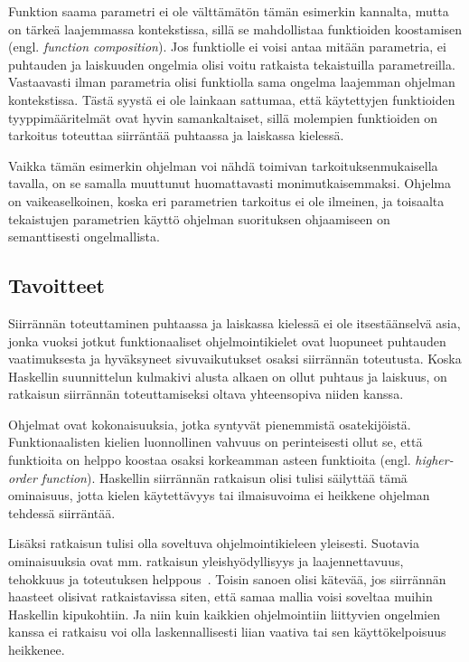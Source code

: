 \documentclass[finnish]{tktltiki2}
\begin{document}
Funktion  saama parametri  ei ole välttämätön tämän esimerkin kannalta,
mutta on tärkeä laajemmassa kontekstissa, sillä se mahdollistaa funktioiden koostamisen (engl.
\emph{function composition}). Jos funktiolle  ei voisi antaa mitään parametria, ei
puhtauden ja laiskuuden ongelmia olisi voitu ratkaista tekaistuilla parametreilla. Vastaavasti ilman
parametria  olisi funktiolla  sama ongelma laajemman ohjelman
kontekstissa. Tästä syystä ei ole lainkaan sattumaa, että käytettyjen funktioiden tyyppimääritelmät
ovat hyvin samankaltaiset, sillä molempien funktioiden on tarkoitus toteuttaa siirräntää puhtaassa
ja laiskassa kielessä.

Vaikka tämän esimerkin ohjelman voi nähdä toimivan tarkoituksenmukaisella tavalla, on se samalla
muuttunut huomattavasti monimutkaisemmaksi. Ohjelma on vaikeaselkoinen, koska eri parametrien
tarkoitus ei ole ilmeinen, ja toisaalta tekaistujen parametrien käyttö ohjelman suorituksen
ohjaamiseen on semanttisesti ongelmallista.

\subsection{Tavoitteet}

Siirrännän toteuttaminen puhtaassa ja laiskassa kielessä ei ole itsestäänselvä asia, jonka vuoksi
jotkut funktionaaliset ohjelmointikielet ovat luopuneet puhtauden vaatimuksesta ja hyväksyneet
sivuvaikutukset osaksi siirrännän toteutusta. Koska Haskellin suunnittelun kulmakivi alusta alkaen
on ollut puhtaus ja laiskuus, on ratkaisun siirrännän toteuttamiseksi oltava yhteensopiva niiden
kanssa.

Ohjelmat ovat kokonaisuuksia, jotka syntyvät pienemmistä osatekijöistä. Funktionaalisten kielien
luonnollinen vahvuus on perinteisesti ollut se, että funktioita on helppo koostaa osaksi korkeamman
asteen funktioita (engl. \emph{higher-order function}). Haskellin siirrännän ratkaisun olisi tulisi
säilyttää tämä ominaisuus, jotta kielen käytettävyys tai ilmaisuvoima ei heikkene ohjelman tehdessä
siirräntää.

Lisäksi ratkaisun tulisi olla soveltuva ohjelmointikieleen yleisesti. Suotavia ominaisuuksia ovat
mm. ratkaisun yleishyödyllisyys ja laajennettavuus, tehokkuus ja toteutuksen helppous~\cite{ifp93}.
Toisin sanoen olisi kätevää, jos siirrännän haasteet olisivat ratkaistavissa siten, että samaa
mallia voisi soveltaa muihin Haskellin kipukohtiin. Ja niin kuin kaikkien ohjelmointiin liittyvien
ongelmien kanssa ei ratkaisu voi olla laskennallisesti liian vaativa tai sen käyttökelpoisuus
heikkenee.
\end{document}
